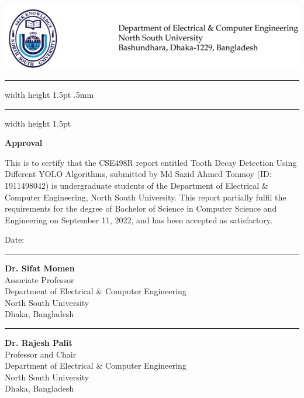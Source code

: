 
\chapter*{}
\vspace*{-5cm}


{\centering \includegraphics[width=\linewidth, scale=1]{02_Approval/letterhead.png}}
{\hrule width \hsize height 1.5pt \kern .5mm \hrule width \hsize height 1.5pt}

\vspace*{2ex}
\begin{center}
\textbf{\Large Approval}
\end{center}

\par This is to certify that the CSE498R report entitled Tooth Decay Detection Using Different YOLO Algorithms, submitted by Md Sazid Ahmed Tonmoy (ID: 1911498042) is undergraduate students of the Department of Electrical & Computer Engineering, North South University. This report partially fulfil the requirements for the degree of Bachelor of Science in Computer Science and Engineering on September 11, 2022, and has been accepted as satisfactory.

\vspace{4em}
\begin{minipage}[t]{0.35\textwidth}
    Date: \\
\end{minipage}%
\hfill
\begin{minipage}[t]{0.55\textwidth}
    \raggedleft
    \hrule\vspace{2ex}
     \textbf{Dr. Sifat Momen} \\
    Associate Professor \\
 	Department of Electrical & Computer Engineering \\
 	North South University \\
 	Dhaka, Bangladesh
	

     \vspace{5em}
     \hrule\vspace{2ex}
     \textbf{Dr. Rajesh Palit} \\
    Professor and Chair \\
 	Department of Electrical & Computer Engineering \\
 	North South University \\
 	Dhaka, Bangladesh
\end{minipage}


\let\cleardoublepage\clearpage
